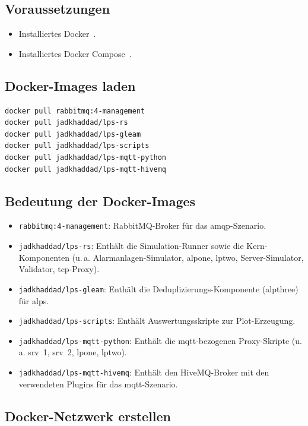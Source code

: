 \subsection{Voraussetzungen}

\begin{itemize}
    \item Installiertes Docker~\citep{docker_2023}.
    \item Installiertes Docker Compose~\citep{docker_compose}.
\end{itemize}

\subsection{Docker-Images laden}

\begin{verbatim}
docker pull rabbitmq:4-management
docker pull jadkhaddad/lps-rs
docker pull jadkhaddad/lps-gleam
docker pull jadkhaddad/lps-scripts
docker pull jadkhaddad/lps-mqtt-python
docker pull jadkhaddad/lps-mqtt-hivemq
\end{verbatim}

\subsection{Bedeutung der Docker-Images}

\begin{itemize}
    \item \texttt{rabbitmq:4-management}: RabbitMQ-Broker für das \gls{amqp}-Szenario.
    \item \texttt{jadkhaddad/lps-rs}: Enthält die Simulation-Runner sowie die Kern-Komponenten (u.\,a. Alarmanlagen-Simulator, \gls{alpone}, \gls{lptwo}, Server-Simulator, Validator, \gls{tcp}-Proxy).
    \item \texttt{jadkhaddad/lps-gleam}: Enthält die Deduplizierungs-Komponente (\gls{alpthree}) für \gls{alps}.
    \item \texttt{jadkhaddad/lps-scripts}: Enthält Auswertungsskripte zur Plot-Erzeugung.
    \item \texttt{jadkhaddad/lps-mqtt-python}: Enthält die \gls{mqtt}-bezogenen Proxy-Skripte (u.\,a. \gls{srv}~1, \gls{srv}~2, \gls{lpone}, \gls{lptwo}).
    \item \texttt{jadkhaddad/lps-mqtt-hivemq}: Enthält den HiveMQ-Broker mit den verwendeten Plugins für das \gls{mqtt}-Szenario.
\end{itemize}

\subsection{Docker-Netzwerk erstellen}

